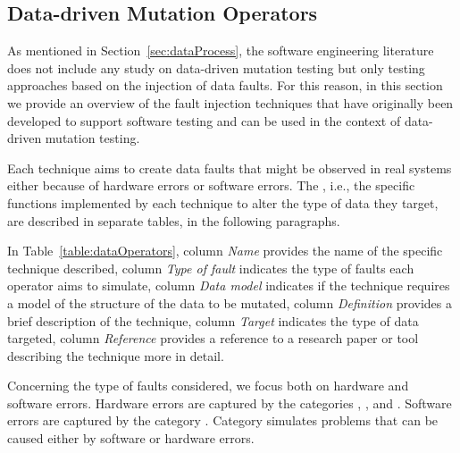 
\subsection{Data-driven Mutation Operators}
\label{sec:data_operators}

As mentioned in Section~\ref{sec:dataProcess}, the software engineering literature does not include any study on data-driven mutation testing but only testing approaches based on the injection of data faults.
For this reason, 
in this section we provide an overview of the fault injection techniques that have originally been developed to support software testing and can be used in the context of data-driven mutation testing. 


Each technique aims to create data faults that might be observed in real systems either because of hardware errors or software errors.
The , i.e., the specific functions implemented by each technique to alter the type of data they target, are described in separate tables, in the following paragraphs. 

In Table~\ref{table:dataOperators}, column \emph{Name} provides the name of the specific technique described,  
 column \emph{Type of fault} indicates the type of faults each operator aims to simulate,
 column \emph{Data model} indicates if the technique requires a model of the structure of the data to be mutated,
 column \emph{Definition} provides a brief description of the technique, column \emph{Target} indicates the type of data targeted,
 column \emph{Reference} provides a reference to a research paper or tool describing the technique more in detail.
 
Concerning the type of faults considered, we focus both on hardware and software errors.
Hardware errors are captured by the categories , , and . 
Software errors are captured by the category .
Category  simulates problems that can be caused either by software or hardware errors.



